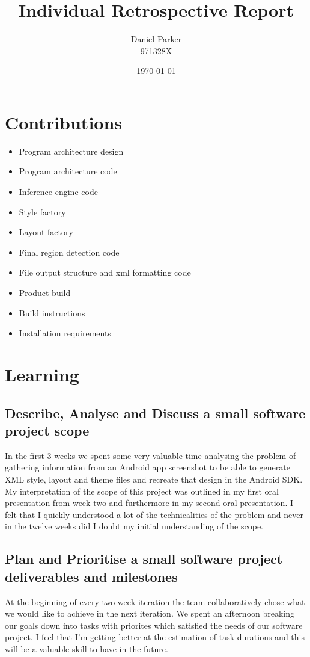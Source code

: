 \documentclass{article}
\title{Individual Retrospective Report}
\author{Daniel Parker \\ 971328X}
\date{\today}
\begin{document}
\maketitle

\section{Contributions}
\begin{itemize}
	\item{Program architecture design}
	\item{Program architecture code}
	\item{Inference engine code}
	\item{Style factory}
	\item{Layout factory}
	\item{Final region detection code}
	\item{File output structure and xml formatting code}
	\item{Product build}
	\item{Build instructions}
	\item{Installation requirements}
\end{itemize}

\maketitle
\section{Learning}
\subsection{Describe, Analyse and Discuss a small software project scope}
In the first 3 weeks we spent some very valuable time analysing the problem of gathering information from an Android app screenshot to be able to generate XML style, layout and theme files and recreate that design in the Android SDK. My interpretation of the scope of this project was outlined in my first oral presentation from week two and furthermore in my second oral presentation. I felt that I quickly understood a lot of the technicalities of the problem and never in the twelve weeks did I doubt my initial understanding of the scope.

\subsection{Plan and Prioritise a small software project deliverables and milestones}
At the beginning of every two week iteration the team collaboratively chose what we would like to achieve in the next iteration. We spent an afternoon breaking our goals down into tasks with priorites which satisfied the needs of our software project. I feel that I'm getting better at the estimation of task durations and this will be a valuable skill to have in the future.
\end{document}
